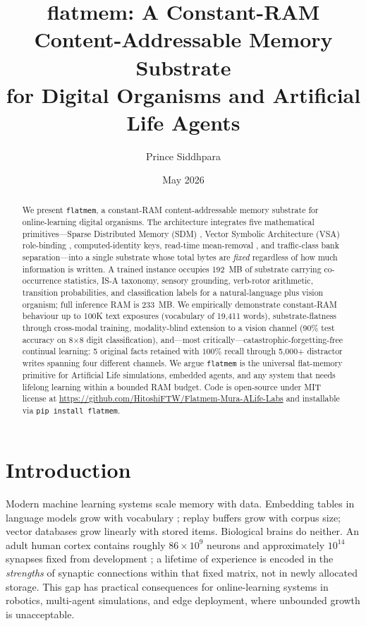 \documentclass[11pt,a4paper]{article}
\title{\textbf{flatmem}: A Constant-RAM Content-Addressable Memory Substrate \\
       for Digital Organisms and Artificial Life Agents}
\author{Prince Siddhpara}
\affil{Mura ALife Labs}
\date{May 2026}
\begin{document}
\maketitle

\begin{abstract}
We present \texttt{flatmem}, a constant-RAM content-addressable memory
substrate for online-learning digital organisms.  The architecture integrates
five mathematical primitives---Sparse Distributed Memory (SDM)
\cite{kanerva1988sparse}, Vector Symbolic Architecture (VSA) role-binding
\cite{plate1995holographic,kanerva2009hyperdimensional}, computed-identity
keys, read-time mean-removal \cite{mu2017all}, and traffic-class bank
separation---into a single substrate whose total bytes are \emph{fixed}
regardless of how much information is written.  A trained instance occupies
192~MB of substrate carrying co-occurrence statistics, IS-A taxonomy,
sensory grounding, verb-rotor arithmetic, transition probabilities, and
classification labels for a natural-language plus vision organism;  full
inference RAM is 233~MB.  We empirically demonstrate constant-RAM behaviour
up to 100K text exposures (vocabulary of 19{,}411 words), substrate-flatness
through cross-modal training, modality-blind extension to a vision channel
(90\% test accuracy on 8$\times$8 digit classification), and---most
critically---catastrophic-forgetting-free continual learning: 5 original
facts retained with $100\%$ recall through 5{,}000+ distractor writes
spanning four different channels.  We argue \texttt{flatmem} is the
universal flat-memory primitive for Artificial Life simulations, embedded
agents, and any system that needs lifelong learning within a bounded RAM
budget.  Code is open-source under MIT license at
\url{https://github.com/HitoshiFTW/Flatmem-Mura-ALife-Labs} and installable
via \texttt{pip install flatmem}.
\end{abstract}

\section{Introduction}
\label{sec:intro}

Modern machine learning systems scale memory with data.  Embedding tables
in language models grow with vocabulary
\cite{mikolov2013distributed,pennington2014glove};  replay buffers grow
with corpus size;  vector databases grow linearly with stored items.
Biological brains do neither.  An adult human cortex contains roughly
$86 \times 10^9$ neurons and approximately $10^{14}$ synapses fixed from
development \cite{bartol2015nanoconnectomic};  a lifetime of experience
is encoded in the \emph{strengths} of synaptic connections within that
fixed matrix, not in newly allocated storage.  This gap has practical
consequences for online-learning systems in robotics, multi-agent
simulations, and edge deployment, where unbounded growth is unacceptable.
\end{document}

